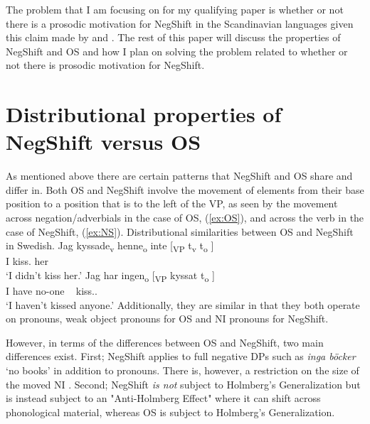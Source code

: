 \documentclass[12pt, letterpaper]{article}
\begin{document}
The problem that I am focusing on for my qualifying paper is whether or not there is a prosodic motivation for NegShift in the Scandinavian languages given this claim made by \citet{christensenInterfacesNegationSyntax2005} and \citet{penkaNegativeIndefinites2011}. The rest of this paper will discuss the properties of NegShift and OS and how I plan on solving the problem related to whether or not there is prosodic motivation for NegShift. 

\section{Distributional properties of NegShift versus OS} \label{sec:DISTRIBUTION}

As mentioned above there are certain patterns that NegShift and OS share and differ in. Both OS and NegShift involve the movement of elements from their base position to a position that is to the left of the VP, as seen by the movement across negation/adverbials in the case of OS, (\ref{ex:OS}), and across the verb in the case of NegShift, (\ref{ex:NS}).
	\ea Distributional similarities between OS and NegShift in Swedish.
		\ea \label{ex:OS}
		\gll Jag kyssade\textsubscript{v} henne\textsubscript{o} inte [\textsubscript{VP} t\textsubscript{v} t\textsubscript{o} ] \\
		I kiss.\Pst{} her \Neg{}\\
		\glt `I didn't kiss her.'
		\ex \label{ex:NS}
		\gll Jag har ingen\textsubscript{o} [\textsubscript{VP} kyssat t\textsubscript{o} ]\\
		I have no-one ~ kiss.\Pst{}.\Ptcp{} \\
		\glt `I haven't kissed anyone.'
		\z 
	\z 
Additionally, they are similar in that they both operate on pronouns, weak object pronouns for OS and NI pronouns for NegShift. 

However, in terms of the differences between OS and NegShift, two main differences exist. First; NegShift applies to full negative DPs such as \textit{inga böcker} `no books' in addition to pronouns. There is, however, a restriction on the size of the moved NI \citep{christensenInterfacesNegationSyntax2005,penkaNegativeIndefinites2011}. Second; NegShift \emph{is not} subject to Holmberg's Generalization but is instead subject to an "Anti-Holmberg Effect" where it can shift across phonological material, whereas OS is subject to Holmberg's Generalization. 
\end{document}
